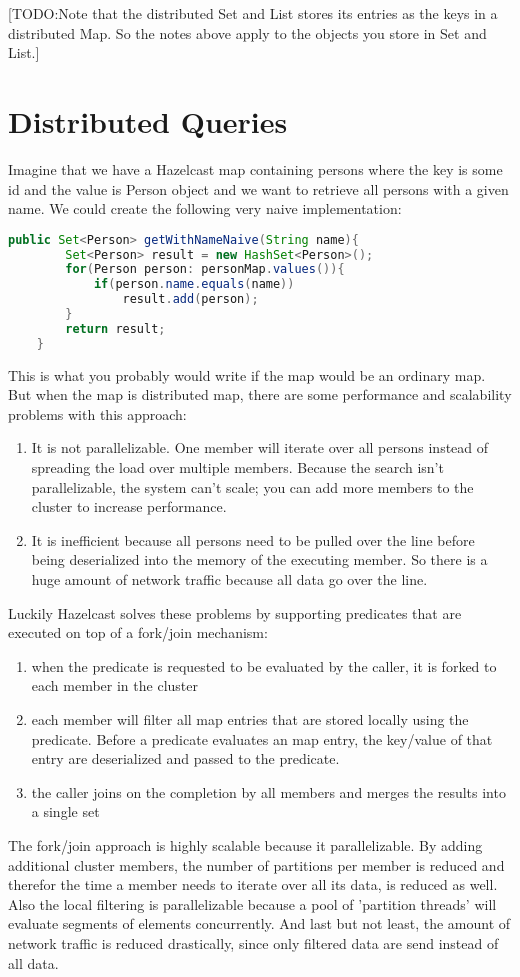 [TODO:Note that the distributed Set and List stores its entries as the keys in a distributed Map. So the notes above apply to the objects you store in Set and List.]

\section{Distributed Queries}
Imagine that we have a Hazelcast map containing persons where the key is some id and the value is Person object and we want to retrieve all persons with a given name. We could create the following very naive implementation:
\begin{lstlisting}[language=java]
   public Set<Person> getWithNameNaive(String name){
        Set<Person> result = new HashSet<Person>();
        for(Person person: personMap.values()){
            if(person.name.equals(name))
                result.add(person);
        }
        return result;
    }
\end{lstlisting}
This is what you probably would write if the map would be an ordinary map. But when the map is distributed map, there are some performance and scalability problems with this approach:
\begin{enumerate}
\item It is not parallelizable. One member will iterate over all persons instead of spreading the load over multiple members. Because the search isn't parallelizable, the system can't scale; you can add more members to the cluster to increase performance.
\item It is inefficient because all persons need to be pulled over the line before being deserialized into the memory of the executing member. So there is a huge amount of network traffic because all data go over the line.
\end{enumerate}

Luckily Hazelcast solves these problems by supporting predicates that are executed on top of a fork/join mechanism:
\begin{enumerate}
\item when the predicate is requested to be evaluated by the caller, it is forked to each member in the cluster
\item each member will filter all map entries that are stored locally using the predicate. Before a predicate evaluates an map entry, the key/value of that entry are deserialized and passed to the predicate. 
\item the caller joins on the completion by all members and merges the results into a single set
\end{enumerate}
The fork/join approach is highly scalable because it parallelizable. By adding additional cluster members, the number of partitions per member is reduced and therefor the time a member needs to iterate over all its data, is reduced as well. Also the local filtering is parallelizable because a pool of 'partition threads' will evaluate segments of elements concurrently. And last but not least, the amount of network traffic is reduced drastically, since only filtered data are send instead of all data.

